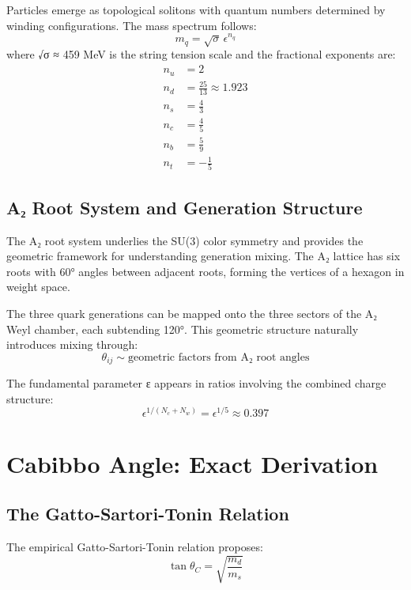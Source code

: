﻿\documentclass[prd,twocolumn,showpacs,superscriptaddress,groupedaddress]{revtex4-2}
\begin{document}
Particles emerge as topological solitons with quantum numbers determined by winding configurations. The mass spectrum follows:
\begin{equation}
m_q = \sqrt{\sigma} \, \epsilon^{n_q}
\end{equation}
where √σ ≈ 459 MeV is the string tension scale and the fractional exponents are:
\begin{align}
n_u &= 2 \\
n_d &= \frac{25}{13} \approx 1.923 \\
n_s &= \frac{4}{3} \\
n_c &= \frac{4}{5} \\
n_b &= \frac{5}{9} \\
n_t &= -\frac{1}{5}
\end{align}

\subsection{A₂ Root System and Generation Structure}

The A₂ root system underlies the SU(3) color symmetry and provides the geometric framework for understanding generation mixing. The A₂ lattice has six roots with 60° angles between adjacent roots, forming the vertices of a hexagon in weight space.

The three quark generations can be mapped onto the three sectors of the A₂ Weyl chamber, each subtending 120°. This geometric structure naturally introduces mixing through:
\begin{equation}
\theta_{ij} \sim \text{geometric factors from A₂ root angles}
\end{equation}

The fundamental parameter ε appears in ratios involving the combined charge structure:
\begin{equation}
\epsilon^{1/(N_c + N_w)} = \epsilon^{1/5} \approx 0.397
\end{equation}

\section{Cabibbo Angle: Exact Derivation}

\subsection{The Gatto-Sartori-Tonin Relation}

The empirical Gatto-Sartori-Tonin relation \cite{Gatto1968} proposes:
\begin{equation}
\tan \theta_C = \sqrt{\frac{m_d}{m_s}}
\end{equation}
\end{document}

